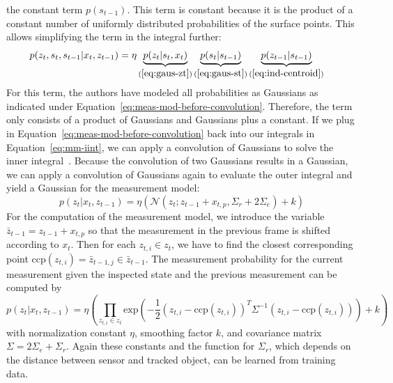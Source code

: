 \documentclass[twoside,a4paper,article]{combine}
\begin{document}
the constant term $p(s_{t-1})$. This term is constant because it is
the product of a constant number of uniformly distributed
probabilities of the surface points. This allows simplifying the
term in the integral further:
\begin{align}
\label{eq:meas-mod-before-convolution}
p(z_t,s_t,s_{t-1}|x_t,z_{t-1})
&=\eta\underbrace{p(z_t|s_t,x_t)}_{(\ref{eq:gaus-zt})}\underbrace{p(s_t|s_{t-1})}_{(\ref{eq:gaus-st})}\underbrace{p(z_{t-1}|s_{t-1})}_{(\ref{eq:ind-centroid})}
\end{align}
For this term, the authors have modeled all probabilities as Gaussians as
indicated under Equation~\ref{eq:meas-mod-before-convolution}.
Therefore, the term only consists of a product of Gaussians and
Gaussians plus a constant. If we plug in
Equation~\ref{eq:meas-mod-before-convolution} back into our integrals
in Equation~\ref{eq:mm-iint}, we can apply a convolution of Gaussians
to solve the inner integral~\cite{prob-rob}. Because the convolution of two Gaussians
results in a Gaussian, we can apply a convolution of Gaussians again
to evaluate the outer integral and yield a Gaussian for the
measurement model:
\begin{equation}
\label{eq:gaus-mm}
p(z_t|x_t,z_{t-1}) =
\eta(\mathcal{N}(z_t;z_{t-1}+x_{t,p},\Sigma_r+2\Sigma_e)+k)
\end{equation}
For the computation of the measurement model, we introduce the
variable $\bar{z}_{t-1}=z_{t-1}+x_{t,p}$ so that the measurement in
the previous frame is shifted according to $x_t$. Then for each
$z_{t,i}\in z_t$, we have to find the closest corresponding point
$\mathrm{ccp}(z_{t,i}) = \bar{z}_{t-1,j}\in \bar{z}_{t-1}$. The measurement
probability for the current measurement given the inspected state and
the previous measurement can be computed by
\begin{equation}
\label{eq:mm-compute}
p(z_t|x_t,z_{t-1}) =
\eta\left(\prod_{z_{t,i}\in z_t}
\mathrm{exp}\left(-\frac{1}{2}(z_{t,i}-\mathrm{ccp}(z_{t,i}))^T\Sigma^{-1}(z_{t,i}-\mathrm{ccp}(z_{t,i}))\right)+k\right)
\end{equation}
with normalization constant $\eta$, smoothing factor $k$, and
covariance matrix $\Sigma = 2\Sigma_e+\Sigma_r$. Again these constants
and the function for $\Sigma_r$, which depends on the distance between
sensor and tracked object, can be learned from training data.
\end{document}
